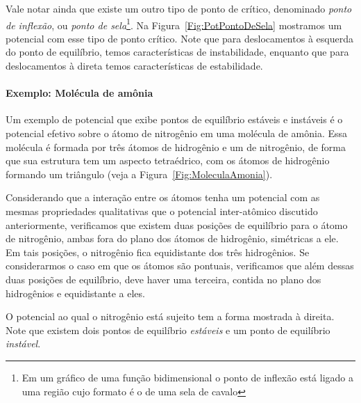 Vale notar ainda que existe um outro tipo de ponto de crítico, denominado \emph{ponto de inflexão}, ou \emph{ponto de sela}\footnote{Em um gráfico de uma função bidimensional o ponto de inflexão está ligado a uma região cujo formato é o de uma sela de cavalo}. Na Figura~\ref{Fig:PotPontoDeSela} mostramos um potencial com esse tipo de ponto crítico. Note que para deslocamentos à esquerda do ponto de equilíbrio, temos características de instabilidade, enquanto que para deslocamentos à direta temos características de estabilidade.

\paragraph{Exemplo: Molécula de amônia}

Um exemplo de potencial que exibe pontos de equilíbrio estáveis e instáveis é o potencial efetivo sobre o átomo de nitrogênio em uma molécula de amônia. Essa molécula é formada por três átomos de hidrogênio e um de nitrogênio, de forma que sua estrutura tem um aspecto tetraédrico, com os átomos de hidrogênio formando um triângulo (veja a Figura~\ref{Fig:MoleculaAmonia}).

Considerando que a interação entre os átomos tenha um potencial com as mesmas propriedades qualitativas que o potencial inter-atômico discutido anteriormente, verificamos que existem duas posições de equilíbrio para o átomo de nitrogênio, ambas fora do plano dos átomos de hidrogênio, simétricas a ele. Em tais posições, o nitrogênio fica equidistante dos três hidrogênios. Se considerarmos o caso em que os átomos são pontuais, verificamos que além dessas duas posições de equilíbrio, deve haver uma terceira, contida no plano dos hidrogênios e equidistante a eles.

\begin{marginfigure}
\centering
{}
\caption{O potencial ao qual o nitrogênio está sujeito tem a forma mostrada à direita. Note que existem dois pontos de equilíbrio \emph{estáveis} e um ponto de equilíbrio \emph{instável}. \label{Fig:PotencialMoleculaAmonia}}
\end{marginfigure}

